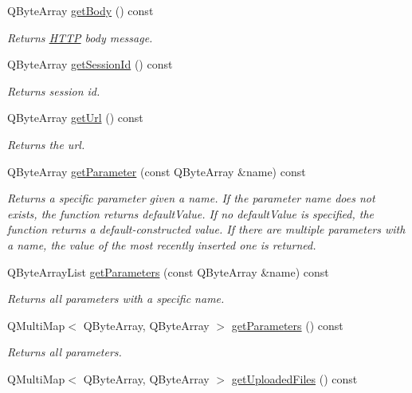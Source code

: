 \begin{DoxyCompactItemize}
Q\+Byte\+Array \hyperlink{class_http_parser_abeee6e30f6494121010bc5498b162870}{get\+Body} () const
\begin{DoxyCompactList}\small\item\em Returns \hyperlink{namespace_h_t_t_p}{H\+T\+TP} body message. \end{DoxyCompactList}\item 
Q\+Byte\+Array \hyperlink{class_http_parser_a60292a9b49d1e86becec848c3d0541bc}{get\+Session\+Id} () const
\begin{DoxyCompactList}\small\item\em Returns session id. \end{DoxyCompactList}\item 
Q\+Byte\+Array \hyperlink{class_http_parser_a7a1db20efbebf30e1f16004a35ab665f}{get\+Url} () const
\begin{DoxyCompactList}\small\item\em Returns the url. \end{DoxyCompactList}\item 
Q\+Byte\+Array \hyperlink{class_http_parser_a69fb981ff2f60058277c51b674006663}{get\+Parameter} (const Q\+Byte\+Array \&name) const
\begin{DoxyCompactList}\small\item\em Returns a specific parameter given a name. If the parameter name does not exists, the function returns default\+Value. If no default\+Value is specified, the function returns a default-\/constructed value. If there are multiple parameters with a name, the value of the most recently inserted one is returned. \end{DoxyCompactList}\item 
Q\+Byte\+Array\+List \hyperlink{class_http_parser_ab0bb302010df956a954fada3061f59f0}{get\+Parameters} (const Q\+Byte\+Array \&name) const
\begin{DoxyCompactList}\small\item\em Returns all parameters with a specific name. \end{DoxyCompactList}\item 
Q\+Multi\+Map$<$ Q\+Byte\+Array, Q\+Byte\+Array $>$ \hyperlink{class_http_parser_ad71aba18e720a76588c1fed96c812f31}{get\+Parameters} () const
\begin{DoxyCompactList}\small\item\em Returns all parameters. \end{DoxyCompactList}\item 
Q\+Multi\+Map$<$ Q\+Byte\+Array, Q\+Byte\+Array $>$ \hyperlink{class_http_parser_a7a887e3a35003a07ba3ec5600260194b}{get\+Uploaded\+Files} () const

\end{DoxyCompactItemize}
